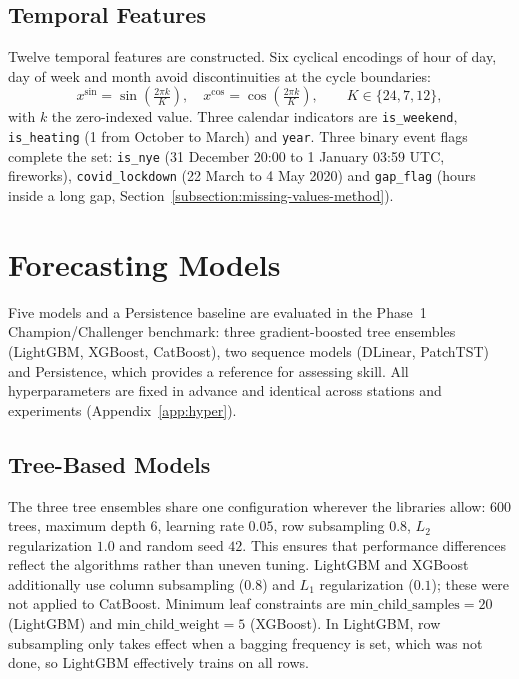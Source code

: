 \subsection{Temporal Features}
\label{subsection:temporal-features}
Twelve temporal features are constructed. Six cyclical encodings of hour of day, day of week and month avoid discontinuities at the cycle boundaries:
\begin{equation}
    x^{\text{sin}} = \sin\!\left(\tfrac{2\pi k}{K}\right), \quad x^{\text{cos}} = \cos\!\left(\tfrac{2\pi k}{K}\right), \qquad K \in \{24, 7, 12\},
\end{equation}
with $k$ the zero-indexed value. Three calendar indicators are \texttt{is\_weekend}, \texttt{is\_heating} (1 from October to March) and \texttt{year}. Three binary event flags complete the set:
\texttt{is\_nye} (31 December 20:00 to 1 January 03:59 UTC, fireworks), \texttt{covid\_lockdown} (22 March to 4 May 2020) and \texttt{gap\_flag} (hours inside a long gap, Section~\ref{subsection:missing-values-method}).

\section{Forecasting Models}
\label{section:forecasting-models}
Five models and a Persistence baseline are evaluated in the Phase~1 Champion/Challenger benchmark: three gradient-boosted tree ensembles (LightGBM, XGBoost, CatBoost), two sequence models (DLinear, PatchTST) and Persistence, which provides a reference for assessing skill. All hyperparameters are fixed in advance and identical across stations and experiments (Appendix~\ref{app:hyper}).

\subsection{Tree-Based Models}
\label{subsection:tree-models}
The three tree ensembles share one configuration wherever the libraries allow: $600$ trees, maximum depth $6$, learning rate $0.05$, row subsampling $0.8$, $L_2$ regularization $1.0$ and random seed $42$. This ensures that performance differences reflect the algorithms rather than uneven tuning. LightGBM and XGBoost additionally use column subsampling ($0.8$) and $L_1$ regularization ($0.1$); these were not applied to CatBoost. Minimum leaf constraints are $\text{min\_child\_samples}=20$ (LightGBM) and $\text{min\_child\_weight}=5$ (XGBoost). In LightGBM, row subsampling only takes effect when a bagging frequency is set, which was not done, so LightGBM effectively trains on all rows.

